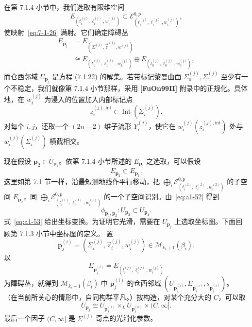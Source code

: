 在第 7.1.4 小节中，我们选取有限维空间
\[
 E_{(t_i^{(j)},\ell_i^{(j)},w_i^{(j)})}
 \subset
 \mathcal E^{0,p}_{(t_i^{(j)},\ell_i^{(j)},w_i^{(j)})},
\]
使映射~\eqref{eq:7-1-26} 满射。它们确定障碍丛
\[
 \begin{aligned}
 E_{\mathbf p_j}
 &=E_{(\Sigma^{(j)},\vec z^{(j)},w^{(j)})}\\
 &\cong
 E_{(t_1^{(j)},\ell_1^{(j)},w_1^{(j)})}
 \oplus
 E_{(t_0^{(j)},\ell_0^{(j)},w_0^{(j)})},
 \end{aligned}
\]
而仓西邻域 $U_{\mathbf p_j}$ 是方程 (7.1.22) 的解集。若带标记黎曼曲面
$\Sigma_0^{(j)},\Sigma_1^{(j)}$ 至少有一个不稳定，我们就像第 7.1.4
小节那样，采用 \textbf{[FuOn99II]} 附录中的正规化。具体地，在
$w_i^{(j)}$ 为浸入的位置加入内部标记点
\[
 z_i^{(j),\mathrm{int}}\in\operatorname{Int}(\Sigma_i^{(j)}).
\]
对每个 $i,j$，还取一个 $(2n-2)$ 维子流形 $Y_i^{(j)}$，使它在
$w_i^{(j)}(z_i^{(j),\mathrm{int}})$ 处与
$w_i^{(j)}(\Sigma_i^{(j)})$ 横截相交。

现在假设 $\mathbf p_2\in U_{\mathbf p_1}$。依第 7.1.4 小节所述的
$E_{\mathbf p_j}$ 之选取，可以假设
\begin{equation}
 E_{\mathbf p_2}\subset E_{\mathbf p_1}.
\tag{A1.52}\label{eq:a1-52}
\end{equation}
这里如第 7.1 节一样，沿最短测地线作平行移动，把
$\bigoplus_i\mathcal E^{0,p}_{(t_i^{(2)},\ell_i^{(2)},w_i^{(2)})}$
的子空间 $E_{\mathbf p_2}$，同
$\bigoplus_i\mathcal E^{0,p}_{(t_i^{(1)},\ell_i^{(1)},w_i^{(1)})}$
的一个子空间识别。由~\eqref{eq:a1-52} 得到
\begin{equation}
 \phi_{\mathbf p_1,\mathbf p_2}\colon
 U_{\mathbf p_2}\subset U_{\mathbf p_1}.
\tag{A1.53}\label{eq:a1-53}
\end{equation}
式~\eqref{eq:a1-53} 给出坐标变换。为证明它光滑，需要在
$U_{\mathbf p_j}$ 上选取坐标图。下面回顾第 7.1.3 小节中坐标图的定义。
置
\[
 \mathbf p_j^{(i)}
 =(\Sigma_i^{(j)},\vec z_i^{(j)},w_i^{(j)})
 \in\mathcal M_{k_i+1}(\beta_i).
\]
以
\[
 E_{\mathbf p_j^{(i)}}
 =E_{(t_i^{(j)},\ell_i^{(j)},w_i^{(j)})}
\]
为障碍丛，就得到 $\mathcal M_{k_i+1}(\beta_i)$ 中
$\mathbf p_j^{(i)}$ 的仓西邻域
$(U_{\mathbf p_j^{(i)}},E_{\mathbf p_j^{(i)}},s_{\mathbf p_j^{(i)}})$。
（在当前所关心的情形中，自同构群平凡。）按构造，对某个充分大的
$C$，可以取
\begin{equation}
 U_{\mathbf p_j}\cong
 U_{\mathbf p_j^{(1)}}\mathbin{\times_L}
 U_{\mathbf p_j^{(0)}}\times(C,\infty].
\tag{A1.54}\label{eq:a1-54}
\end{equation}
最后一个因子 $(C,\infty]$ 是 $\Sigma^{(j)}$ 奇点的光滑化参数。

